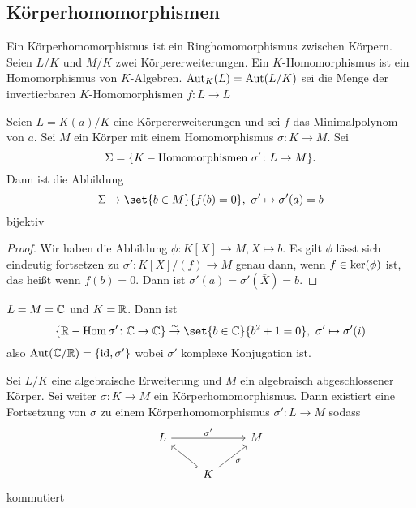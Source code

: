 \subsection{Körperhomomorphismen}
\begin{Def}
    Ein Körperhomomorphismus ist ein Ringhomomorphismus zwischen Körpern. Seien $L/K$ und $M/K$ zwei Körpererweiterungen. Ein $K$-Homomorphismus ist ein Homomorphismus von $K$-Algebren.
    $\operatorname{Aut}_K(L)=\operatorname{Aut}(L/K)$ sei die Menge der invertierbaren $K$-Homomorphismen $f\colon L\to L$
\end{Def}
\begin{Lemma}
 Seien $L=K(a)/K$ eine Körpererweiterungen und sei $f$ das Minimalpolynom von $a$. Sei $M$ ein Körper mit einem Homomorphismus $\sigma\colon K\to M$. Sei $$\Sigma=\{K-\text{Homomorphismen } \sigma'\colon L\to M\}.$$ Dann ist die Abbildung 
    $$\Sigma\to\set{b\in M}{ f(b)=0},\ \sigma'\mapsto \sigma'(a)=b$$ bijektiv
\end{Lemma}
\begin{proof}
    Wir haben die Abbildung $\phi\colon K[X]\to M, X\mapsto b$. Es gilt $\phi$ lässt sich eindeutig fortsetzen zu $\sigma'\colon K[X]/(f)\to M$ genau dann, wenn $f\in \operatorname{ker}(\phi)$ ist, das heißt wenn $f(b)=0$. Dann ist $\sigma'(a)=\sigma'(\bar X)=b$.
\end{proof}
\begin{Bsp}
    $L=M=\mathbb{C}$ und $K=\mathbb{R}$. Dann ist
    $$\{\RR-\Hom \sigma'\colon\CC\to\CC\} \stackrel{\sim}{\to}\set{b\in\CC}{b^2+1=0},\ \sigma'\mapsto \sigma'(i)$$
    also $\operatorname{Aut}(\mathbb{C}/\mathbb{R})=\{\mathrm{id},\sigma'\}$ wobei $\sigma'$ komplexe Konjugation ist.
\end{Bsp}
\begin{Satz}\label{Satz:AlgAbMor}
    Sei $L/K$ eine algebraische Erweiterung und $M$ ein algebraisch abgeschlossener Körper. Sei weiter $\sigma\colon K\to M$ ein Körperhomomorphismus. Dann existiert eine Fortsetzung von $\sigma$ zu einem Körperhomomorphismus $\sigma'\colon L\to M$ sodass $$%
\begin{tikzcd}
L \arrow[rr, "\sigma'"] &                                          & M \\
                        & K \arrow[ru, "\sigma"'] \arrow[lu, hook] &  
\end{tikzcd}$$ kommutiert
\end{Satz}
